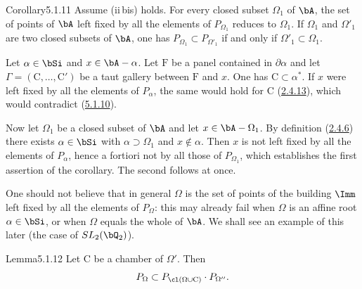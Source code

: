 \documentclass[12pt,a4paper,oneside,english]{smfart}
\makeatletter
\newcommand{\btanchor}[1]{\leavevmode\Hy@raisedlink{\hypertarget{bt:#1}{}}}
\newcommand{\btref}[1]{\hyperlink{bt:#1}{#1}}
\theoremstyle{definition}
\theoremstyle{bt}
\makeatother
\begin{document}
\begin{btstat}{Corollary}{5.1.11}\btanchor{5.1.11}
Assume \textup{(ii\,bis)} holds. For every closed subset $\Omega_{1}$ of $\bA$,
the set of points of $\bA$ left fixed by all the elements of $P_{\Omega_{1}}$
reduces to $\Omega_{1}$. If $\Omega_{1}$ and $\Omega'_{1}$ are two closed
subsets of $\bA$, one has $P_{\Omega_{1}}\subset P_{\Omega'_{1}}$ if and only
if $\Omega'_{1}\subset\Omega_{1}$.
\end{btstat}

Let $\alpha\in\bSi$ and $x\in\bA-\alpha$. Let $\mathrm{F}$ be a panel contained
in $\partial\alpha$ and let $\Gamma=(\mathrm{C},\dots,\mathrm{C}')$ be a taut
gallery between $\mathrm{F}$ and $x$. One has $\mathrm{C}\subset\alpha^{*}$. If
$x$ were left fixed by all the elements of $P_{\alpha}$, the same would hold for
$\mathrm{C}$ (\btref{2.4.13}), which would contradict (\btref{5.1.10}).

Now let $\Omega_{1}$ be a closed subset of $\bA$ and let $x\in\bA-\Omega_{1}$.
By definition (\btref{2.4.6}) there exists $\alpha\in\bSi$ with $\alpha\supset\Omega_{1}$
and $x\notin\alpha$. Then $x$ is not left fixed by all the elements of
$P_{\alpha}$, hence a fortiori not by all those of $P_{\Omega_{1}}$, which
establishes the first assertion of the corollary. The second follows at once.

\medskip
One should not believe that in general $\Omega$ is the set of points of the
building $\Imm$ left fixed by all the elements of $P_{\Omega}$: this may already
fail when $\Omega$ is an affine root $\alpha\in\bSi$, or when $\Omega$ equals
the whole of $\bA$. We shall see an example of this later (the case of
$SL_{2}(\bQ_{2})$).

\begin{btstat}{Lemma}{5.1.12}\btanchor{5.1.12}
Let $\mathrm{C}$ be a chamber of $\Omega'$. Then
\[
P_{\Omega}\subset P_{\cl(\Omega\cup \mathrm{C})}\cdot P_{\Omega''}.
\]
\end{btstat}
\end{document}
